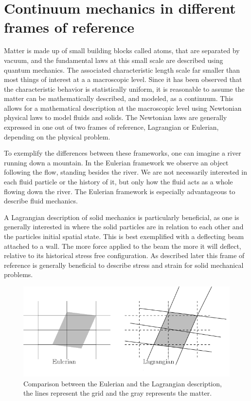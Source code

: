\chapter{Continuum mechanics in different frames of reference}
Matter is made up of small building blocks called atoms, that are separated by vacuum, and the fundamental laws at this small scale are described using quantum mechanics. The associated characteristic length scale far smaller than most things of interest at a a macroscopic level. Since it has been observed that the characteristic behavior is statistically uniform, it is reasonable to assume the matter can be mathematically described, and modeled, as a continuum. This allows for a mathematical description at the macroscopic level using Newtonian physical laws to model fluids and solids. The Newtonian laws are generally expressed in one out of two frames of reference, Lagrangian or Eulerian, depending on the physical problem. \newline

To exemplify the differences between these frameworks, one can imagine a river running down a mountain.	
In the Eulerian framework we observe an object following the flow, standing besides the river. We are not necessarily interested in each fluid particle or the history of it, but only how the fluid acts as a whole flowing down the river. The Eulerian framework is especially advantageous to describe fluid mechanics.\newline

A Lagrangian description of solid mechanics is particularly beneficial, as one is generally interested in where the solid particles are in relation to each other and the particles initial spatial state.  
This is best exemplified with a deflecting beam attached to a wall. The more force applied to the beam the more it will deflect, relative to its historical stress free configuration. As described later this frame of reference is generally beneficial to describe stress and strain for solid mechanical problems.\newline

\begin{figure}[H]
\label{pic:E_L}
\includegraphics[scale=0.50]{./Continuum_mechanics/E_L.png}
\caption{Comparison between the Eulerian and the Lagrangian description, the lines represent the grid and the gray represents the matter.}
\end{figure}

